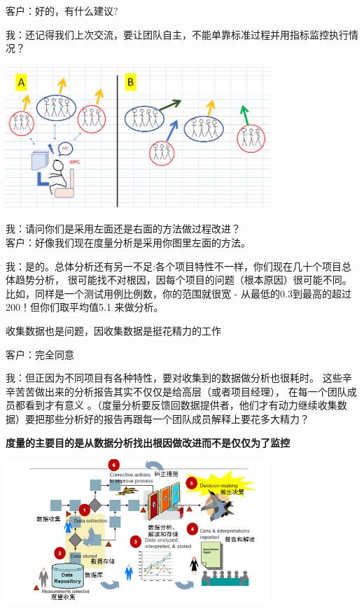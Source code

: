 客户：好的，有什么建议?

我：还记得我们上次交流，要让团队自主，不能单靠标准过程并用指标监控执行情况？


\includegraphics[width=10cm]{Diagram20.png}

我：请问你们是采用左面还是右面的方法做过程改进？\\
客户：好像我们现在度量分析是采用你图里左面的方法。

我：是的。总体分析还有另一不足:各个项目特性不一样，你们现在几十个项目总体趋势分析，
很可能找不对根因，因每个项目的问题（根本原因）很可能不同。
比如，同样是一个测试用例比例数，你的范围就很宽 -
从最低的0.3到最高的超过200！但你们取平均值5.1 来做分析。

收集数据也是问题，因收集数据是挺花精力的工作

客户：完全同意

我：但正因为不同项目有各种特性，要对收集到的数据做分析也很耗时。
这些辛辛苦苦做出来的分析报告其实不仅仅是给高层（或者项目经理），
在每一个团队成员都看到才有意义
。（度量分析要反馈回数据提供者，他们才有动力继续收集数据）要把那些分析好的报告再跟每一个团队成员解释上要花多大精力？

\textbf{度量的主要目的是从数据分析找出根因做改进而不是仅仅为了监控}


\includegraphics[width=10cm]{Ma4CarScreenshot20211227205004.png}

